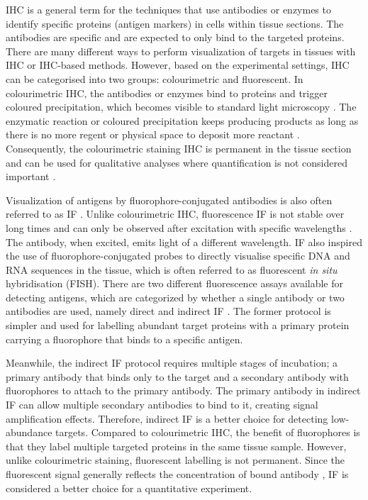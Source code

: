 IHC is a general term for the techniques that use antibodies or enzymes to identify specific proteins (antigen markers) in cells within tissue sections. The antibodies are specific and are expected to only bind to the targeted proteins. There are many different ways to perform visualization of targets in tissues with IHC or IHC-based methods. However, based on the experimental settings, IHC can be categorised into two groups: colourimetric and fluorescent. In colourimetric IHC, the antibodies or enzymes bind to proteins and trigger coloured precipitation, which becomes visible to standard light microscopy \cite{BOURGEOIS2014132}. The enzymatic reaction or coloured precipitation keeps producing products as long as there is no more regent or physical space to deposit more reactant \cite{corthell2014basic}. Consequently, the colourimetric staining IHC is permanent in the tissue section and can be used for qualitative analyses where quantification is not considered important \cite{seidal2001interpretation}. 

Visualization of antigens by fluorophore-conjugated antibodies is also often referred to as IF \cite{joshi2017immunofluorescence}. Unlike colourimetric IHC, fluorescence IF is not stable over long times and can only be observed after excitation with specific wavelengths \cite{corthell2014basic}. The antibody, when excited, emits light of a different wavelength. IF also inspired the use of fluorophore-conjugated probes to directly visualise specific DNA and RNA sequences in the tissue, which is often referred to as fluorescent \textit{in situ} hybridisation (FISH). There are two different fluorescence assays available for detecting antigens, which are categorized by whether a single antibody or two antibodies are used, namely direct and indirect IF \cite{JOSHI2017135}. The former protocol is simpler and used for labelling abundant target proteins with a primary protein carrying a fluorophore that binds to a specific antigen.

Meanwhile, the indirect IF protocol requires multiple stages of incubation; a primary antibody that binds only to the target and a secondary antibody with fluorophores to attach to the primary antibody. The primary antibody in indirect IF can allow multiple secondary antibodies to bind to it, creating signal amplification effects. Therefore, indirect IF is a better choice for detecting low-abundance targets. Compared to colourimetric IHC, the benefit of fluorophores is that they label multiple targeted proteins in the same tissue sample. However, unlike colourimetric staining, fluorescent labelling is not permanent. Since the fluorescent signal generally reflects the concentration of bound antibody \cite{dabbs2017diagnostic}, IF is considered a better choice for a quantitative experiment.

